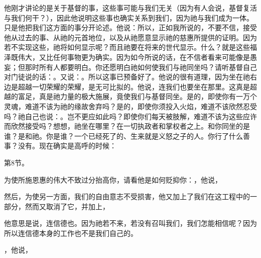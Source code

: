 他刚才讲论的是关于基督的事，这些事可能与我们无关（因为有人会说，基督复活与我们何干？），因此他说明这些事也确实关系到我们，因为祂与我们成为一体。只是他把我们这方面的事分开论述。他说：所以，正如我所说的，不要不信，接受他从过去的事、从祂的元首地位，以及从祂愿意显示祂的慈惠所提供的证明。因为若不实现这些，祂将如何显示呢？而且祂要在将来的世代显示。什么？就是这些福泽既伟大，又比任何事物更为确实。因为如今所说的话，在不信者看来可能像是愚妄；但那时所有人都要明白。你还愿明白祂如何使我们与祂同坐吗？请听基督自己对门徒说的话：。又说：。所以这事已预备好了。他说的很有道理，因为坐在祂右边是超越一切荣耀的荣耀，是无可比拟的。他说，连我们也要坐在那里。这真是超越的富足，真是祂力量的极大施展，竟使我们与基督同坐。是的，即使你有一万个灵魂，难道不该为祂的缘故舍弃吗？是的，即使你须投入火焰，难道不该欣然忍受吗？祂自己也说：。岂不更应如此吗？即使你们每天被肢解，难道不该为这些应许而欣然接受吗？想想，祂坐在哪里？在一切执政者和掌权者之上。和你同坐的是谁？是和祂。你是谁？一个已经死了的、生来就是义怒之子的人。你行了什么善事？没有。现在确实是高呼的时候：\par

第8节。\par

为使所施恩惠的伟大不致过分抬高你，请看他是如何贬抑你：，他说，\par

\par

然后，为使另一方面，我们的自由意志不受损害，他又加上了我们在这工程中的一部分，然而又取消了它，并加上，\par

\par

他意思是说，连信德也。因为祂若不来，若没有召叫我们，我们怎能相信呢？因为所以连信德本身的工作也不是我们自己的。\par

，他说，\par

